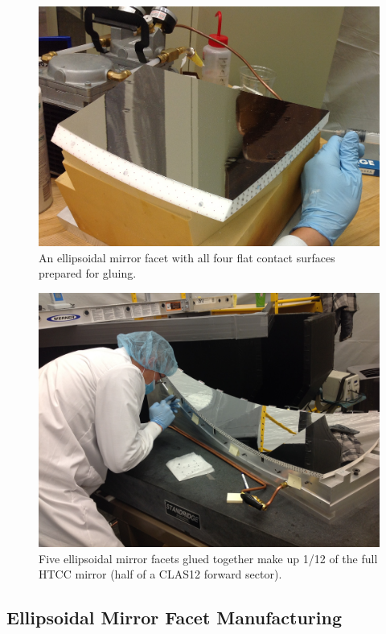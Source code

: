 \begin{figure}[ht]
    \centering
    \includegraphics[width=1.0\linewidth]{images/Picture2.png}
    \caption{An ellipsoidal mirror facet with all four flat contact surfaces prepared for gluing.}
    \label{fig:facet}
\end{figure}
\begin{figure}[ht]
    \centering
    \includegraphics[trim={20cm 15cm 0 10cm },clip,width=\linewidth]{images/Picture3.JPG}
    \caption{Five ellipsoidal mirror facets glued together make up 1/12 of the full HTCC mirror (half of a CLAS12
      forward sector).}
    \label{fig:Picture3}
\end{figure}

\subsection {Ellipsoidal Mirror Facet Manufacturing}

